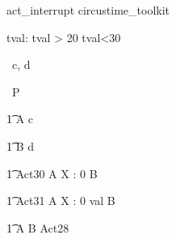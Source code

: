 \begin{zsection}
   \SECTION act\_interrupt \parents circustime\_toolkit
\end{zsection}


\begin{axdef}
   tval: \nat
\where
   tval > 20 \land tval<30
\end{axdef}


\begin{circus}
   \circchannel\ c, d \\
\end{circus}

\begin{circus}
    \circprocess\ P \circdef \circbegin \\
\end{circus}


\begin{circusaction}
    	\t1 A \circdef c \then \Skip \\
\end{circusaction}

\begin{circusaction}
        \t1 B \circdef d \then \Skip \\
\end{circusaction}


\begin{circusaction}
    	\t1 Act30 \circdef A \circtimedinterrupt \lcirctime X : 0  \rcirctime B \\
\end{circusaction}

\begin{circusaction}
    	\t1 Act31 \circdef A \circtimedinterrupt \lcirctime X : 0 \upto val \rcirctime B \\
\end{circusaction}


\begin{circusaction}        
        \t1 \circspot A \circseq B \extchoice Act28\\
\end{circusaction}

\begin{circus}    
\circend
\end{circus}
